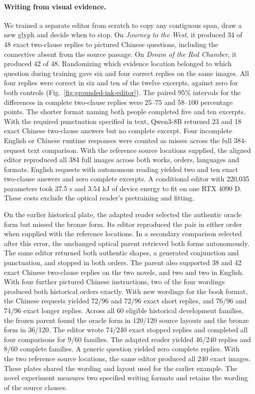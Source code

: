 \paragraph{Writing from visual evidence.}
We trained a separate editor from scratch to copy any contiguous span, draw a new glyph and decide when to stop. On \textit{Journey to the West}, it produced 34 of 48 exact two-clause replies to pictured Chinese questions, including the connective absent from the source passage. On \textit{Dream of the Red Chamber}, it produced 42 of 48. Randomizing which evidence location belonged to which question during training gave six and four correct replies on the same images. All four replies were correct in six and ten of the twelve excerpts, against zero for both controls (Fig.~\ref{fig:grounded-ink-editor}). The paired 95\% intervals for the differences in complete two-clause replies were 25--75 and 58--100 percentage points. The shorter format naming both people completed five and ten excerpts. With the required punctuation specified in text, Qwen3-8B returned 23 and 18 exact Chinese two-clause answers but no complete excerpt. Four incomplete English or Chinese runtime responses were counted as misses across the full 384-request text comparison. With the reference source locations supplied, the aligned editor reproduced all 384 full images across both works, orders, languages and formats. English requests with autonomous reading yielded two and ten exact two-clause answers and zero complete excerpts. A conditional editor with 220,035 parameters took 37.5 s and 3.54 kJ of device energy to fit on one RTX 4090 D. These costs exclude the optical reader's pretraining and fitting.

On the earlier historical plate, the adapted reader selected the authentic oracle form but missed the bronze form. Its editor reproduced the pair in either order when supplied with the reference locations. In a secondary comparison selected after this error, the unchanged optical parent retrieved both forms autonomously. The same editor returned both authentic shapes, a generated conjunction and punctuation, and stopped in both orders. The parent also supported 38 and 42 exact Chinese two-clause replies on the two novels, and two and two in English. With four further pictured Chinese instructions, two of the four wordings produced both historical orders exactly. With new wordings for the book format, the Chinese requests yielded 72/96 and 72/96 exact short replies, and 76/96 and 74/96 exact longer replies. Across all 60 eligible historical development families, the frozen parent found the oracle form in 120/120 source layouts and the bronze form in 36/120. The editor wrote 74/240 exact stopped replies and completed all four comparisons for 9/60 families. The adapted reader yielded 46/240 replies and 8/60 complete families. A generic question yielded zero complete replies. With the two reference source locations, the same editor produced all 240 exact images. These plates shared the wording and layout used for the earlier example. The novel experiment measures two specified writing formats and retains the wording of the source clauses.
